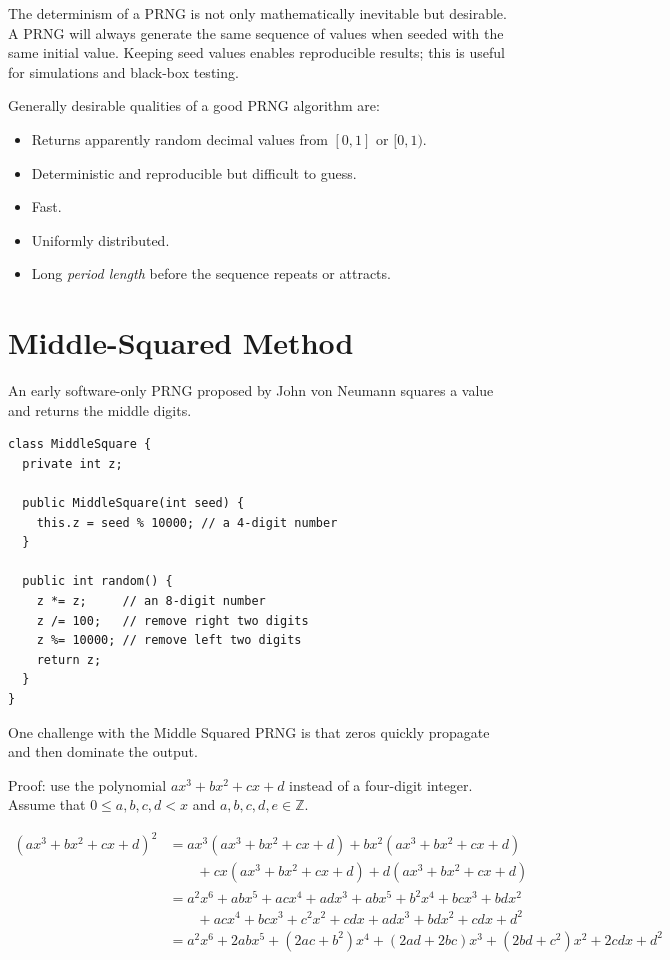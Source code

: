 \documentclass{book}
\begin{document}
The determinism of a PRNG is not only mathematically inevitable but desirable. A PRNG will always generate the same sequence of values when seeded with the same initial value. Keeping seed values enables reproducible results; this is useful for simulations and black-box testing.

Generally desirable qualities of a good PRNG algorithm are:

\begin{itemize}
\item Returns apparently random decimal values from $[0,1]$ or $[0,1)$.
\item Deterministic and reproducible but difficult to guess.
\item Fast.
\item Uniformly distributed.
\item Long \textit{period length} before the sequence repeats or attracts.
\end{itemize}

\section{Middle-Squared Method}

An early software-only PRNG proposed by John von Neumann squares a value and returns the middle digits.

\begin{lstlisting}[caption={A Middle-Squared program for four-digit numbers}]
class MiddleSquare {
  private int z;

  public MiddleSquare(int seed) {
    this.z = seed % 10000; // a 4-digit number
  }

  public int random() {
    z *= z;     // an 8-digit number
    z /= 100;   // remove right two digits
    z %= 10000; // remove left two digits
    return z;
  }
}
\end{lstlisting}

One challenge with the Middle Squared PRNG is that zeros quickly propagate and then dominate the output.

Proof: use the polynomial $ax^3 + bx^2 + cx + d$ instead of a four-digit integer. Assume that $0 \le a,b,c,d < x$ and $a,b,c,d,e \in \mathbb{Z}$.


\begin{equation}
\begin{split}
(ax^3 + bx^2 + cx + d)^2 &=
ax^3(ax^3 + bx^2 + cx + d) + bx^2(ax^3 + bx^2 + cx + d)\\
&\qquad+ cx(ax^3 + bx^2 + cx + d) + d(ax^3 + bx^2 + cx + d)\\
&= a^2x^6 + abx^5 + acx^4 + adx^3 + abx^5+ b^2x^4 + bcx^3 + bdx^2\\
&\qquad+ acx^4 + bcx^3 + c^2x^2+ cdx + adx^3 + bdx^2 + cdx + d^2\\
&= a^2x^6 + 2abx^5 + (2ac+b^2)x^4 + (2ad+2bc)x^3 + (2bd+c^2)x^2 + 2cdx + d^2
\end{split}
\end{equation}
\end{document}
